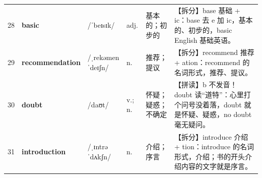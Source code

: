 \documentclass[UTF8,a4paper,11pt,oneside]{ctexbook}
\newcommand{\cellword}[1]{{\bfseries\textcolor{wordcol}{#1}}}
\newcommand{\cellipa}[1]{{\footnotesize\textcolor{ipacol}{#1}}}
\newcommand{\cellpos}[1]{\textcolor{poscol}{#1}}
\newcommand{\cellno}[1]{\textcolor{volcolor!75!black}{#1}}
\begin{document}
{\begin{longtable}{@{}C{0.045\textwidth}L{0.155\textwidth}L{0.175\textwidth}C{0.070\textwidth}L{0.180\textwidth}L{0.282\textwidth}@{}}
\cellno{28} & \cellword{basic} & \cellipa{/ˈbeɪsɪk/} & \cellpos{adj.} & 基本的；初步的 & \textcolor{tagSplit}{【拆分】}base 基础 + ic：base 去 e 加 ic，基本的、初步的，basic English 基础英语。 \\
 \cellno{29} & \cellword{recommendation} & \cellipa{/ˌrekəmenˈdeɪʃn/} & \cellpos{n.} & 推荐；提议 & \textcolor{tagSplit}{【拆分】}recommend 推荐 + ation：recommend 的名词形式，推荐、提议。 \\
\cellno{30} & \cellword{doubt} & \cellipa{/daʊt/} & \cellpos{v.;\allowbreak{} n.} & 怀疑；疑惑；不确定 & \textcolor{tagSpell}{【拼读】}b 不发音！doubt 读“道特”：心里打个问号没着落，doubt 就是怀疑、疑惑，no doubt 毫无疑问。 \\
 \cellno{31} & \cellword{introduction} & \cellipa{/ˌɪntrəˈdʌkʃn/} & \cellpos{n.} & 介绍；序言 & \textcolor{tagSplit}{【拆分】}introduce 介绍 + tion：introduce 的名词形式，介绍；书的开头介绍内容的文字就是序言。 \\
\end{longtable}
}

\end{document}
